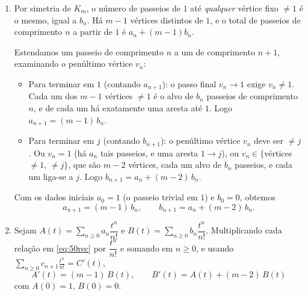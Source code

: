 \begin{enumerate}[label=(\alph*)]

\item Por simetria de $K_m$, o número de passeios de $1$ até \emph{qualquer} vértice fixo $\neq1$ é o mesmo, igual a $b_n$. Há $m-1$ vértices distintos de $1$, e o total de passeios de comprimento $n$ a partir de $1$ é $a_n+(m-1)b_n$.

Estendamos um passeio de comprimento $n$ a um de comprimento $n+1$, examinando o penúltimo vértice $v_n$:
\begin{itemize}
\item Para terminar em $1$ (contando $a_{n+1}$): o passo final $v_n\to1$ exige $v_n\neq1$. Cada um dos $m-1$ vértices $\neq1$ é o alvo de $b_n$ passeios de comprimento $n$, e de cada um há exatamente uma aresta até $1$. Logo $a_{n+1}=(m-1)\,b_n$.
\item Para terminar em $j$ (contando $b_{n+1}$): o penúltimo vértice $v_n$ deve ser $\neq j$. Ou $v_n=1$ (há $a_n$ tais passeios, e uma aresta $1\to j$), ou $v_n\in\{$vértices $\neq1,\,\neq j\}$, que são $m-2$ vértices, cada um alvo de $b_n$ passeios, e cada um liga-se a $j$. Logo $b_{n+1}=a_n+(m-2)\,b_n$.
\end{itemize}
Com os dados iniciais $a_0=1$ (o passeio trivial em $1$) e $b_0=0$, obtemos
\begin{equation}\label{eq:50rec}
a_{n+1}=(m-1)\,b_n,\qquad b_{n+1}=a_n+(m-2)\,b_n.
\end{equation}

\item Sejam $A(t)=\sum_{n\ge0}a_n\dfrac{t^n}{n!}$ e $B(t)=\sum_{n\ge0}b_n\dfrac{t^n}{n!}$. Multiplicando cada relação em \eqref{eq:50rec} por $\dfrac{t^n}{n!}$ e somando em $n\ge0$, e usando $\sum_{n\ge0}c_{n+1}\frac{t^n}{n!}=C'(t)$,
\begin{equation}\label{eq:50sys}
\boxed{\;A'(t)=(m-1)\,B(t),\qquad B'(t)=A(t)+(m-2)\,B(t)\;}
\end{equation}
com $A(0)=1$, $B(0)=0$.


\end{enumerate}
